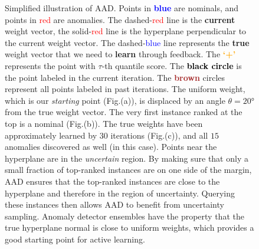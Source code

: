 \documentclass{article} %
\begin{document}
\begin{figure}
	\caption{Simplified illustration of AAD. Points in \textbf{\textcolor{blue}{blue}} are nominals, and points in \textcolor{red}{red} are anomalies. The dashed-\textcolor{red}{red} line is the \textbf{current} weight vector, the solid-\textcolor{red}{red} line is the hyperplane perpendicular to the current weight vector. The dashed-\textcolor{blue}{blue} line represents the \textbf{true} weight vector that we need to \textbf{learn} through feedback. The \textbf{\textcolor{orange}{`+'}} represents the point with $\tau$-th quantile score. The \textbf{\textcolor{black}{black circle}} is the point labeled in the current iteration. The \textbf{\textcolor{brown}{brown}} circles represent all points labeled in past iterations. The uniform weight, which is our \textit{starting} point (Fig.(a)), is displaced by an angle $\theta=\ang{20}$ from the true weight vector. The very first instance ranked at the top is a nominal (Fig.(b)). The true weights have been approximately learned by $30$ iterations (Fig.(c)), and all $15$ anomalies discovered as well (in this case). Points near the hyperplane are in the \textit{uncertain} region. By making sure that only a small fraction of top-ranked instances are on one side of the margin, AAD ensures that the top-ranked instances are close to the hyperplane and therefore in the region of uncertainty. Querying these instances then allows AAD to benefit from uncertainty sampling. Anomaly detector ensembles have the property that the true hyperplane normal is close to uniform weights, which provides a good starting point for active learning.} \label{fig:percept}
\end{figure}
\end{document}
